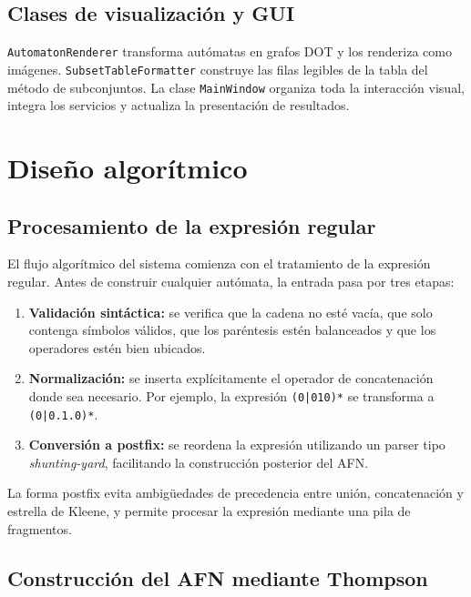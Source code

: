 \documentclass[12pt]{article}
\begin{document}
\subsection{Clases de visualización y GUI}

\texttt{AutomatonRenderer} transforma autómatas en grafos DOT y los renderiza como imágenes. \texttt{SubsetTableFormatter} construye las filas legibles de la tabla del método de subconjuntos. La clase \texttt{MainWindow} organiza toda la interacción visual, integra los servicios y actualiza la presentación de resultados.

\section{Diseño algorítmico}

\subsection{Procesamiento de la expresión regular}

El flujo algorítmico del sistema comienza con el tratamiento de la expresión regular. Antes de construir cualquier autómata, la entrada pasa por tres etapas:

\begin{enumerate}[label=\arabic*.]
    \item \textbf{Validación sintáctica:} se verifica que la cadena no esté vacía, que solo contenga símbolos válidos, que los paréntesis estén balanceados y que los operadores estén bien ubicados.
    \item \textbf{Normalización:} se inserta explícitamente el operador de concatenación donde sea necesario. Por ejemplo, la expresión \texttt{(0|010)*} se transforma a \texttt{(0|0.1.0)*}.
    \item \textbf{Conversión a postfix:} se reordena la expresión utilizando un parser tipo \textit{shunting-yard}, facilitando la construcción posterior del AFN.
\end{enumerate}

La forma postfix evita ambigüedades de precedencia entre unión, concatenación y estrella de Kleene, y permite procesar la expresión mediante una pila de fragmentos.

\subsection{Construcción del AFN mediante Thompson}
\end{document}
